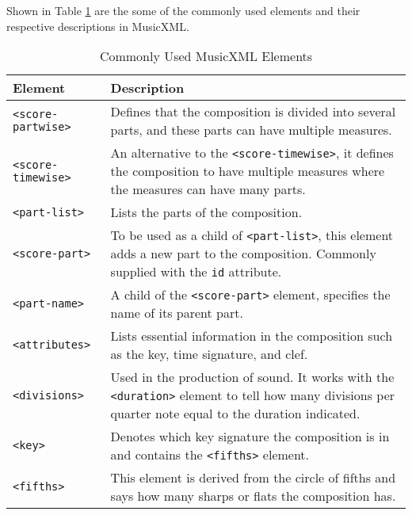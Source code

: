 Shown in Table \ref{tab:musicxml} are the some of the commonly used elements and their respective descriptions in MusicXML.
 
\begin{longtable}{|p{3.6cm}|p{10cm}|} 
\caption{Commonly Used MusicXML Elements} \label{tab:musicxml} \\
\hline
       
       Element & Description \\ \hline
		
        \texttt{<score-partwise>} & Defines that the composition is divided into several parts, and these parts can have multiple measures. \\ \hline
        
        \texttt{<score-timewise>} & An alternative to the \texttt{<score-timewise>}, it defines the composition to have multiple measures where the measures can have many parts. \\ \hline

		\texttt{<part-list>} & Lists the parts of the composition. \\ \hline
        
        \texttt{<score-part>} & To be used as a child of \texttt{<part-list>}, this element adds a new part to the composition. Commonly supplied with the \texttt{id} attribute. \\ \hline
        
        \texttt{<part-name>} & A child of the \texttt{<score-part>} element, specifies the name of its parent part. \\ \hline
        
        \texttt{<attributes>} & Lists essential information in the composition such as the key, time signature, and clef. \\ \hline
        
        \texttt{<divisions>} &  Used in the production of sound. It works with the \texttt{<duration>} element to tell how many divisions per quarter note equal to the duration indicated. \\ \hline
        
        \texttt{<key>} & Denotes which key signature the composition is in and contains the \texttt{<fifths>} element. \\ \hline
        
        \texttt{<fifths>} & This element is derived from the circle of fifths and says how many sharps or flats the composition has. \\ \hline
        

\end{longtable}
